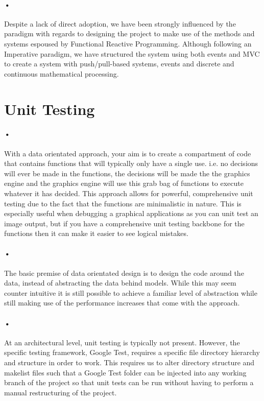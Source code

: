 \documentclass[11pt]{article}
\begin{document}
\paragraph{•}
Despite a lack of direct adoption, we have been strongly influenced by the paradigm with regards to designing the project to make use of the methods and systems espoused by Functional Reactive Programming. Although following an Imperative paradigm, we have structured the system using both events and MVC to create a system with push/pull-based systems, events and discrete and continuous mathematical processing.


\section{Unit Testing}
\paragraph{•}
With a data orientated approach, your aim is to create a compartment of code that contains functions that will typically only have a single use. i.e. no decisions will ever be made in the functions, the decisions will be made the the graphics engine and the graphics engine will use this grab bag of functions to execute whatever it has decided. This approach allows for powerful, comprehensive unit testing due to the fact that the functions are minimalistic in nature. This is especially useful when debugging a graphical applications as you can unit test an image output, but if you have a comprehensive unit testing backbone for the functions then it can make it easier to see logical mistakes.
\paragraph{•}
The basic premise of data orientated design is to design the code around the data, instead of abstracting the data behind models. While this may seem counter intuitive it is still possible to achieve a familiar level of abstraction while still making use of the performance increases that come with the approach.
\paragraph{•}
At an architectural level, unit testing is typically not present. However, the specific testing framework, Google Test, requires a specific file directory hierarchy and structure in order to work. This requires us to alter directory structure and makelist files such that a Google Test folder can be injected into any working branch of the project so that unit tests can be run without having to perform a manual restructuring of the project.
\end{document}
